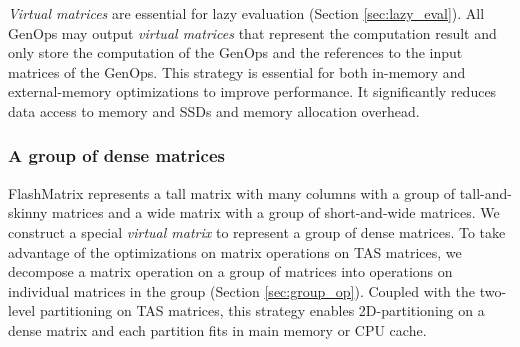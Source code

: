 \textit{Virtual matrices} are essential for lazy evaluation (Section
\ref{sec:lazy_eval}). All GenOps may output \textit{virtual matrices} that
represent the computation result and only store the computation of the GenOps
and the references to the input matrices of the GenOps. This strategy is
essential for both in-memory and external-memory optimizations to improve
performance. It significantly reduces data access to memory and SSDs and
memory allocation overhead.




\subsubsection{A group of dense matrices} \label{sec:mat_group}
FlashMatrix represents a tall matrix with many columns with a group of
tall-and-skinny matrices and a wide matrix with a group of short-and-wide
matrices. We construct a special \textit{virtual matrix} to represent
a group of dense matrices. To take advantage of the optimizations on matrix
operations on TAS matrices, we decompose a matrix operation on a group of
matrices into operations on individual matrices in the group (Section
\ref{sec:group_op}).
Coupled with the two-level partitioning on TAS matrices, this strategy enables
2D-partitioning on a dense matrix and each partition fits in main memory
or CPU cache.

